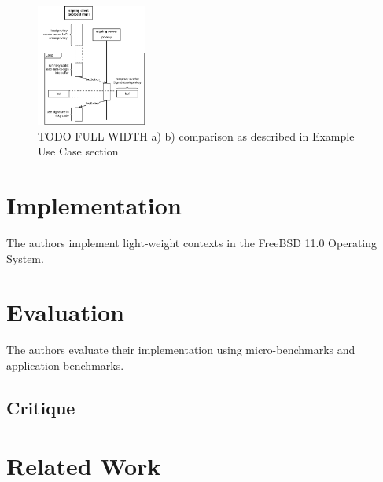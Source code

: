 \documentclass[10pt,twocolumn,letter]{article}
\begin{document}
\begin{figure}[h]
  \label{design:usage:apparchpre}
  \label{design:usage:apparchpost}
  \centering
  \includegraphics[height=4cm]{fig/encryption-compartment}
  \caption{
    TODO FULL WIDTH a)  b) comparison as described in Example Use Case section
  }
\end{figure}

\section{Implementation}\label{impl}

The authors implement light-weight contexts in the FreeBSD 11.0 Operating System.


\section{Evaluation}\label{eval}

The authors evaluate their implementation using micro-benchmarks and application benchmarks.

\subsection{Critique}\label{eval:crit}


\section{Related Work}\label{rel}
\end{document}
